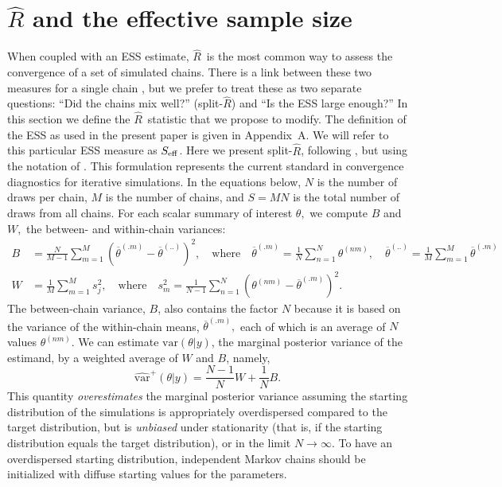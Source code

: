 \documentclass[american,]{article}
\newcommand{\Rhat}{$\widehat{R}$}
\newcommand{\sRhat}{split-$\widehat{R}$}
\theoremstyle{definition}
\begin{document}
\hypertarget{SplitRhat}{%
\section{$\widehat{R}$ and the effective sample size}\label{SplitRhat}}

When coupled with an ESS estimate,  \Rhat\ is the most common way to
assess the convergence of a set of simulated chains.  There is a link between
these two measures  for a single chain \citep{vats2018revisiting}, but we prefer to 
treat these as two separate questions: ``Did the chains mix well?'' (\sRhat) and 
``Is the ESS large enough?''  In this section we define the \Rhat\ 
statistic that we propose to modify. 
The definition of the ESS as used in the present paper is given in Appendix~A.
We will refer to this particular ESS measure as \(S_{\rm eff}\).
%
%
Here we present split-\(\widehat{R}\),
following \citet{BDA3}, but using the notation of
\citet{StanManual.2.18.0}. This formulation represents the current 
standard in convergence diagnostics for iterative simulations. In the
equations below, \(N\) is the number of draws per chain, \(M\) is the
number of chains, and \(S=MN\) is the total number of draws from all
chains. For each scalar summary of interest \(\theta,\) we compute \(B\)
and \(W,\) the between- and within-chain variances:
\begin{align}
B &= \frac{N}{M-1}\sum_{m=1}^{M}(\overline{\theta}^{(.m)} - 
\overline{\theta}^{(..)})^2, \quad \mbox{where} \quad 
\overline{\theta}^{(.m)}=\frac{1}{N}\sum_{n=1}^N \theta^{(nm)}, \quad
\overline{\theta}^{(..)} = \frac{1}{M}\sum_{m=1}^M\overline{\theta}^{(.m)} 
\\
W &= \frac{1}{M}\sum_{m=1}^{M}s_j^2, \quad \mbox{where} \quad
s_m^2=\frac{1}{N-1} \sum_{n=1}^N (\theta^{(nm)}-\overline{\theta}^{(.m)})^2.
\end{align}
The between-chain variance, \(B\), also contains the factor \(N\)
because it is based on the variance of the within-chain means,
\(\overline{\theta}^{(.m)},\) each of which is an average of \(N\)
values \(\theta^{(nm)}\). We can estimate \(\mbox{var}(\theta | y)\),
the marginal posterior variance of the estimand, by a weighted average
of \(W\) and \(B\), namely,
\begin{equation}
\widehat{\mbox{var}}^+(\theta| y) = \frac{N-1}{N}W + \frac{1}{N}B.
\end{equation}
This quantity \emph{overestimates} the marginal posterior variance
assuming the starting distribution of the simulations is appropriately
overdispersed compared to the target distribution, but is
\emph{unbiased} under stationarity (that is, if the starting
distribution equals the target distribution), or in the limit
\(N\rightarrow\infty\). To have an overdispersed starting distribution,
independent Markov chains should be initialized with diffuse starting
values for the parameters. 
\end{document}
